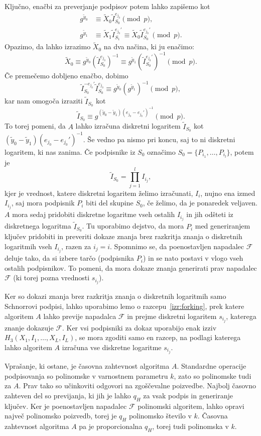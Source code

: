 \begin{dokaz}
Ključno, enačbi za preverjanje podpisov potem lahko zapišemo kot
\begin{align*}
    g^{\tilde{y}_0} &\equiv \tilde{X}_0 \tilde{I}_{S_0}^{e_{j_0}} \pmod p, \\
    g^{\tilde{y}_1} &\equiv \tilde{X}_1 \tilde{I}_{S_1}^{e_{j_0}'}
        \equiv \tilde{X}_0 \tilde{I}_{S_0}^{e_{j_0}'} \pmod p.
\end{align*}
Opazimo, da lahko izrazimo $\tilde{X}_0$ na dva načina, ki ju enačimo:
$$
\tilde{X}_0 \equiv g^{\tilde{y}_0}(\tilde{I}_{S_0}^{e_{j_0}})^{-1}
    \equiv g^{\tilde{y}_1}(\tilde{I}_{S_0}^{e_{j_0}'})^{-1} \pmod p.
$$
Če premečemo dobljeno enačbo, dobimo
$$
\tilde{I}_{S_0}^{- e_{j_0}'} \tilde{I}_{S_0}^{e_{j_0}} \equiv g^{\tilde{y}_0}(g^{\tilde{y}_1})^{-1} \pmod p,
$$
kar nam omogoča izraziti $\tilde{I}_{S_0}$ kot
$$
\tilde{I}_{S_0} \equiv g^{(\tilde{y}_0 - \tilde{y}_1) (e_{j_0} - e_{j_0}')^{-1}} \pmod p.
$$
To torej pomeni, da $A$ lahko izračuna diskretni logaritem $\tilde{I}_{S_0}$ kot 
$(\tilde{y}_0 - \tilde{y}_1) (e_{j_0} - e_{j_0}')^{-1}$. Še vedno pa nismo pri koncu, saj to ni
diskretni logaritem, ki nas zanima. Če podpisnike iz $S_0$ označimo $S_0 = \{P_{i_1}, \dots, P_{i_l}\}$,
potem je 
$$
\tilde{I}_{S_0} = \prod_{j=1}^l I_{i_j},
$$
kjer je vrednost, katere diskretni logaritem želimo izračunati, $I_i$, nujno ena izmed $I_{i_j}$,
saj mora podpisnik $P_i$ biti del skupine $S_0$, če želimo, da je ponaredek veljaven. $A$ mora sedaj
pridobiti diskretne logaritme vseh ostalih $I_{i_j}$ in jih odšteti iz diskretnega logaritma
$\tilde{I}_{S_0}$. Tu uporabimo dejstvo, da mora $P_i$ med generiranjem ključev pridobiti in preveriti
dokaze znanja brez razkritja znanja o diskretnih logaritmih vseh $I_{i_j}$, razen za $i_j = i$.
Spomnimo se, da poenostavljen napadalec $\mathcal{F}$ deluje tako, da si izbere tarčo (podpisnika $P_i$)
in se nato postavi v vlogo vseh ostalih podpisnikov. To pomeni, da mora dokaze znanja generirati
prav napadalec $\mathcal{F}$ (ki torej pozna vrednosti $s_{i_j}$).

Ker so dokazi znanja brez razkritja znanja o diskretnih logaritmih samo Schnorrovi podpisi, lahko
uporabimo lemo o razcepu~\ref{izr:forking}, prek katere algoritem $A$ lahko previje napadalca
$\mathcal{F}$ in prejme diskretni logaritem $s_{i_j}$, katerega znanje dokazuje $\mathcal{F}$.
Ker vsi podpisniki za dokaz uporabijo enak izziv $H_3(X_1, I_1, \dots, X_L, I_L)$, se
mora zgoditi samo en razcep, na podlagi katerega lahko algoritem $A$ izračuna vse diskretne
logaritme $s_{i_j}$.

Vprašanje, ki ostane, je časovna zahtevnost algoritma $A$. Standardne operacije podpisovanja
so polinomske v varnostnem parametru $k$, zato so polinomske tudi za $A$. Prav tako so učinkoviti
odgovori na zgoščevalne poizvedbe. Najbolj časovno zahteven del so previjanja, ki jih je lahko $q_H$
za vsak podpis in generiranje ključev. Ker je poenostavljen napadalec $\mathcal{F}$ polinomski algoritem,
lahko opravi največ polinomsko poizvedb, torej je $q_H$ polinomsko število v $k$. Časovna zahtevnost
algoritma $A$ pa je proporcionalna $q_H$, torej tudi polinomska v $k$.


\end{dokaz}

